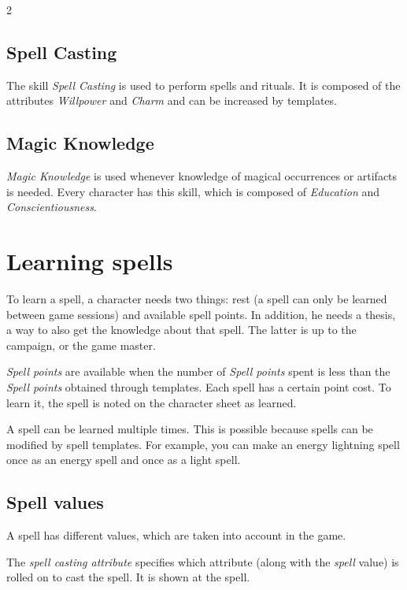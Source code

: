 \begin{multicols}{2}
\subsection{Spell Casting}

The skill \textit{Spell Casting} is used to perform spells and rituals. It is composed of the attributes \textit{Willpower} and \textit{Charm} and can be increased by templates.

\subsection{Magic Knowledge}

\textit{Magic Knowledge} is used whenever knowledge of magical occurrences or artifacts is needed. Every character has this skill, which is composed of \textit{Education} and \textit{Conscientiousness}.

\section{Learning spells}

To learn a spell, a character needs two things: rest (a spell can only be learned between game sessions) and available spell points. In addition, he needs a thesis, a way to also get the knowledge about that spell. The latter is up to the campaign, or the game master.

\textit{Spell points} are available when the number of \textit{Spell points} spent is less than the \textit{Spell points} obtained through templates. Each spell has a certain point cost. To learn it, the spell is noted on the character sheet as learned.

A spell can be learned multiple times. This is possible because spells can be modified by spell templates. For example, you can make an energy lightning spell once as an energy spell and once as a light spell.

\subsection{Spell values}

A spell has different values, which are taken into account in the game.

The \textit{spell casting attribute} specifies which attribute (along with the \textit{spell} value) is rolled on to cast the spell. It is shown at the spell.


\end{multicols}
